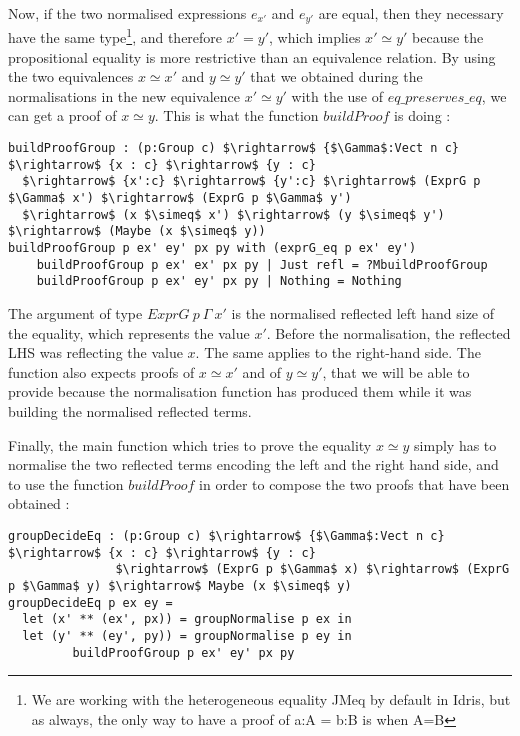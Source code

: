 Now, if the two normalised expressions $e_{x'}$ and $e_{y'}$ are equal, then they necessary have the same type\footnote{We are working with the heterogeneous equality JMeq by default in Idris, but as always, the only way to have a proof of a:A = b:B is when A=B}, and therefore $x'=y'$, which implies $x' \simeq y'$ because the propositional equality is more restrictive than an equivalence relation.
By using the two equivalences $x \simeq x'$ and $y \simeq y'$ that we obtained during the normalisations in the new equivalence $x' \simeq y'$ with the use of $eq\_preserves\_eq$, we can get a proof of $x \simeq y$. This is what the function $buildProof$ is doing :

\begin{lstlisting}
buildProofGroup : (p:Group c) $\rightarrow$ {$\Gamma$:Vect n c} $\rightarrow$ {x : c} $\rightarrow$ {y : c} 
  $\rightarrow$ {x':c} $\rightarrow$ {y':c} $\rightarrow$ (ExprG p $\Gamma$ x') $\rightarrow$ (ExprG p $\Gamma$ y') 
  $\rightarrow$ (x $\simeq$ x') $\rightarrow$ (y $\simeq$ y') $\rightarrow$ (Maybe (x $\simeq$ y))
buildProofGroup p ex' ey' px py with (exprG_eq p ex' ey')
    buildProofGroup p ex' ex' px py | Just refl = ?MbuildProofGroup
    buildProofGroup p ex' ey' px py | Nothing = Nothing
\end{lstlisting}

The argument of type $ExprG\ p\ \Gamma\ x'$ is the normalised reflected left hand size of the equality, which represents the value $x'$. Before the normalisation, the reflected LHS was reflecting the value $x$. The same applies to the right-hand side. The function also expects proofs of $x \simeq x'$ and of $y \simeq y'$, that we will be able to provide because the normalisation function has produced them while it was building the normalised reflected terms.


Finally, the main function which tries to prove the equality $x \simeq y$ simply has to normalise the two reflected terms encoding the left and the right hand side, and to use the function $buildProof$ in order to compose the two proofs that have been obtained :

\begin{lstlisting}
groupDecideEq : (p:Group c) $\rightarrow$ {$\Gamma$:Vect n c} $\rightarrow$ {x : c} $\rightarrow$ {y : c} 
               $\rightarrow$ (ExprG p $\Gamma$ x) $\rightarrow$ (ExprG p $\Gamma$ y) $\rightarrow$ Maybe (x $\simeq$ y)
groupDecideEq p ex ey =
  let (x' ** (ex', px)) = groupNormalise p ex in
  let (y' ** (ey', py)) = groupNormalise p ey in
	     buildProofGroup p ex' ey' px py
\end{lstlisting}


